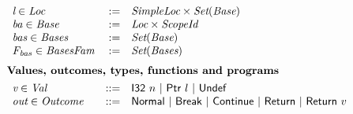 \begin{figure}[H]
\[{\begin{array}{lrl}
    \Locvar \in \Loc                        & :=        & \Simpleloc \times \Set{\Base}         \\
    \Basevar \in \Base                      & :=        & \Loc \times \Scopeid                  \\
    \Basesvar \in \Bases                    & :=        & \Set{\Base}                           \\
    \Basesfamvar \in \Basesfam              & :=        & \Set{\Bases}                 \\[6pt]
\multicolumn{3}{l}{\hspace{-5pt}\textbf{Values, outcomes, types, functions and programs}} \\[4pt]
    \Valvar \in \Val                        & \bnfdef   & \vint{n} \ | \ \ptr{l} \ | \ \vundef  \\
    \Outcomevar \in \Outcome                            & \bnfdef   & \onormal  \ | \ \obreak \ | \ \ocontinue\ | \ \oreturn \ | \ \oreturnv{v} \\
  

\end{array}}\]
\end{figure}
